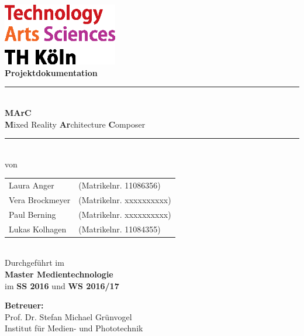 \thispagestyle{empty}
\begin{center}
			\includegraphics[width=5cm]{Bilder/logo_TH}\\[12ex]
			{\Huge\textbf{Projektdokumentation}}\\[8ex]
			\rule{.8\textwidth}{.2pt}
			{\Large\\[1ex] \textbf{MArC}}\\
			{\textbf{M}ixed Reality \textbf{Ar}chitecture \textbf{C}omposer}\\
			\rule{.8\textwidth}{.2pt}\\[10ex]
			von\\[2ex]
			\begin{tabular}{ll}
			Laura Anger &(Matrikelnr. 11086356)\\ 
			Vera Brockmeyer &(Matrikelnr. xxxxxxxxxx)\\
			Paul Berning &(Matrikelnr. xxxxxxxxxx)\\
			Lukas Kolhagen &(Matrikelnr. 11084355)\\
			\end{tabular}\\[10ex]
			Durchgeführt im\\ \textbf{Master Medientechnologie}\\
			im \textbf{SS 2016} und \textbf{WS 2016/17}\\			
			\end{center}
			\vfill
			\begin{flushleft}
			{\bf Betreuer:}\\
			Prof. Dr. Stefan Michael Grünvogel\\
			Institut für Medien- und Phototechnik
			\end{flushleft}
	\newpage